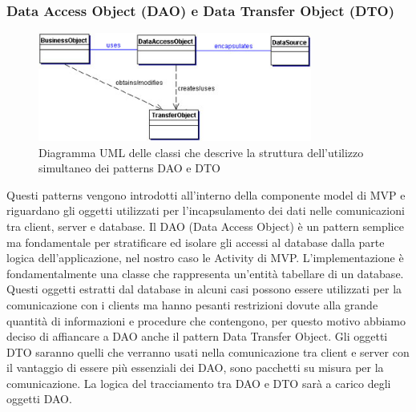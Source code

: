 \subsubsection{Data Access Object (DAO)  e  Data Transfer Object (DTO)}
\begin{figure}[h]
\centering
\includegraphics[width=9cm]{img/ST/daodto.png}
\caption{Diagramma UML delle classi che descrive la struttura dell'utilizzo
simultaneo dei patterns DAO e DTO}
\end{figure}
Questi patterns vengono introdotti all'interno della componente model di MVP e
riguardano gli oggetti utilizzati per l'incapsulamento dei dati nelle
comunicazioni tra client, server e database. 
Il DAO (Data Access Object) \`e un pattern semplice ma fondamentale per
stratificare ed isolare gli accessi al database dalla parte logica
dell'applicazione, nel nostro caso le Activity di MVP. L'implementazione \`e
fondamentalmente una classe che rappresenta un'entit\`a tabellare di un database.
Questi oggetti estratti dal database in alcuni casi possono essere utilizzati
per la comunicazione con i clients ma hanno pesanti restrizioni dovute alla
grande quantit\`a di informazioni e procedure che contengono, per questo motivo
abbiamo deciso di affiancare a DAO anche il pattern Data Transfer Object. Gli
oggetti DTO saranno quelli che verranno usati nella comunicazione tra client
e server con il vantaggio di essere pi\`u essenziali dei DAO, sono pacchetti su
misura per la comunicazione. La logica del tracciamento tra DAO e DTO sar\`a a
carico degli oggetti DAO.

\newpage
